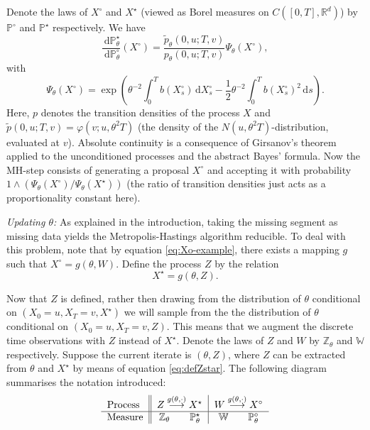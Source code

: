 \documentclass[preprint]{imsart}
\renewcommand{\th}{\theta}
\renewcommand{\phi}{\varphi}
\newcommand{\RR}{\mathbb{R}}
\renewcommand{\tilde}{\widetilde}
\newcommand{\bb}[1]{\mathbb{#1}}
\theoremstyle{definition}
\newcommand{\dd}{{\,\mathrm d}}
\begin{document}
Denote the laws of $X^\circ$ and $X^\star$ (viewed as Borel measures on $C([0,T], \RR^d)$) by $\bb{P}^\circ$ and $\bb{P}^\star$ respectively.  We have
\begin{equation}\label{eq:llratio}	\frac{\dd \bb{P}^\star_\th}{\dd \bb{P}^\circ_\th}(X^\circ) = \frac{\tilde{p}_\th(0,u; T,v)}{p_\th(0,u; T,v)} \Psi_\th(X^\circ), 
\end{equation}
with 
\[ \Psi_{\th}(X^\circ) = \exp\left( \th^{-2}\int_0^T b(X^\circ_s) \dd X^\circ_s -\frac12\th^{-2} \int_0^T b(X^\circ_s)^2 \dd s\right). \]
Here, $p$  denotes the transition densities of the process $X$ and $\tilde{p}(0,u;T,v)=\phi(v; u, \th^2 T)$ (the  density of the $N(u,\th^2 T)$-distribution, evaluated at $v$).  Absolute continuity is a consequence of Girsanov's theorem applied to the unconditioned processes and the abstract Bayes' formula. Now the MH-step consists of generating a proposal $X^\circ$ and accepting it with probability $1 \wedge \left(\Psi_\th(X^\circ)/ \Psi_\th(X^\star)\right)$ (the ratio of transition densities just acts as a proportionality constant here). 


{\it Updating $\th$:}  
As explained in the introduction, taking the missing segment as missing data yields the Metropolis-Hastings algorithm reducible. To deal with this problem, note that by equation \eqref{eq:Xo-example}, there exists a mapping $g$ such that  $X^\circ=g(\th, W)$.
Define the process $Z$ by the relation
\begin{equation}\label{eq:defZstar} X^\star = g(\th, Z). \end{equation}

Now that $Z$ is defined, rather then drawing from the distribution of $\th$ conditional on $(X_0=u, X_T=v, X^\star)$ we will sample from the the distribution of $\th$ conditional on $(X_0=u, X_T=v, Z)$. This means that we augment the discrete time observations with $Z$ instead of $X^\star$. 
Denote the laws of $Z$ and $W$ by $\bb{Z}_\th$ and $\bb{W}$
respectively. Suppose the current iterate is $(\th, Z)$, where $Z$ can be extracted from $\th$ and $X^\star$ by means of equation \eqref{eq:defZstar}. 
The following diagram summarises the notation introduced:
\begin{equation}
\label{eq:measures}
\centering
\begin{tabular}{ l || c | c} 
Process& $Z \stackrel{g(\th, \cdot)}{\longrightarrow} X^\star$ & $W \stackrel{g(\th, \cdot)}{\longrightarrow} X^\circ$ \\
\hline 
Measure & $\mathbb{Z}_\th \qquad \mathbb{P}^\star_\th$ & $\mathbb{W} \qquad  \mathbb{P}^\circ_\th$ \\
\end{tabular}
\end{equation}
\end{document}
